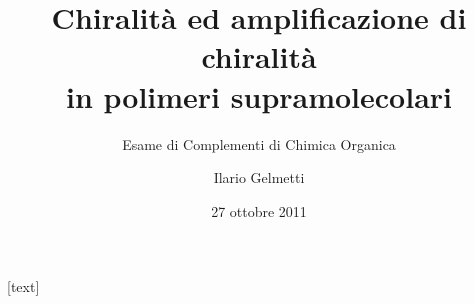 \documentclass{beamer}
\title[Chiralità in polimeri supramolecolari]{Chiralità ed amplificazione di chiralità\\ in polimeri supramolecolari}
\subtitle{Esame di Complementi di Chimica Organica}
\author{Ilario Gelmetti}
\institute{Scuola Normale Superiore di Pisa.\\Professore Lorenzo Di Bari.}
\date{27 ottobre 2011}
\begin{document}
\begin{frame}
  \titlepage
\end{frame}







[text] %
\begin{frame}[plain
]
{\tiny{

}}
\end{frame}
\end{document}
